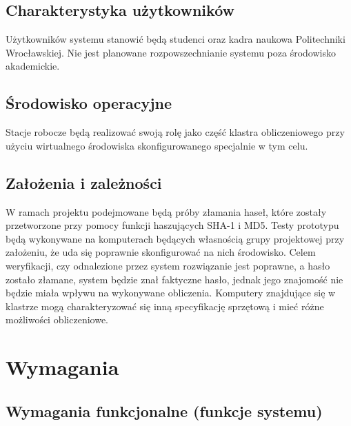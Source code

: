 \documentclass[a4paper,10pt]{article}
\begin{document}
\subsection{Charakterystyka użytkowników}
Użytkowników systemu stanowić będą studenci oraz kadra naukowa Politechniki Wrocławskiej. Nie jest planowane rozpowszechnianie systemu poza środowisko akademickie.
\subsection{Środowisko operacyjne}
Stacje robocze będą realizować swoją rolę jako część klastra obliczeniowego przy użyciu wirtualnego środowiska skonfigurowanego specjalnie w tym celu.
\subsection{Założenia i zależności}
W ramach projektu podejmowane będą próby złamania haseł, które zostały przetworzone przy pomocy funkcji haszujących SHA-1 i MD5. Testy prototypu będą wykonywane na komputerach będących własnością grupy projektowej przy założeniu, że uda się poprawnie skonfigurować na nich środowisko. Celem weryfikacji, czy odnalezione przez system rozwiązanie jest poprawne, a hasło zostało złamane, system będzie znał faktyczne hasło, jednak jego znajomość nie będzie miała wpływu na wykonywane obliczenia. Komputery znajdujące się w klastrze mogą charakteryzować się inną specyfikację sprzętową i mieć różne możliwości obliczeniowe.
\section{Wymagania}
\subsection{Wymagania funkcjonalne (funkcje systemu)}
\end{document}
